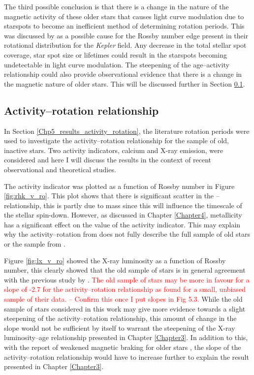 The third possible conclusion is that there is a change in the nature of the magnetic activity of these older stars that causes light curve modulation due to starspots to become an inefficient method of determining rotation periods. This was discussed by \citet{van_Saders_etal_2019} as a possible cause for the Rossby number edge present in their rotational distribution for the \textit{Kepler} field. Any decrease in the total stellar spot coverage, star spot size or lifetimes could result in the starspots becoming undetectable in light curve modulation. The steepening of the age--activity relationship \citet{Booth_etal_2017} could also provide observational evidence that there is a change in the magnetic nature of older stars. This will be discussed further in Section \ref{Chp5_discuss_activity_rotation}.

\subsection{Activity--rotation relationship}
\label{Chp5_discuss_activity_rotation}
In Section \ref{Chp5_results_activity_rotation}, the literature rotation periods were used to investigate the activity--rotation relationship for the sample of old, inactive stars. Two activity indicators, calcium and X-ray emission, were considered and here I will discuss the results in the context of recent observational and theoretical studies.

The \Rprime activity indicator was plotted as a function of Rossby number in Figure \ref{fig:rhk_v_ro}. This plot shows that there is significant scatter in the \Rprime--\Ro relationship, this is partly due to mass since this will influence the timescale of the stellar spin-down. However, as discussed in Chapter \ref{Chapter4}, metallicity has a significant effect on the value of the \Rprime activity indicator. This may explain why the activity--rotation from \citet{Mamajek_Hillenbrand_2008} does not fully describe the full sample of old stars or the sample from \citet{Baliunas_etal_1996}.

Figure \ref{fig:lx_v_ro} showed the X-ray luminosity as a function of Rossby number, this clearly showed that the old sample of stars is in general agreement with the previous study by \citet{Wright_etal_2011}. \textcolor{red}{The old sample of stars may be more in favour for a slope of -2.7 for the activity--rotation relationship as \citet{Wright_etal_2011} found for a small, unbiased sample of their data. -- Confirm this once I put slopes in Fig 5.3.} While the old sample of stars considered in this work may give more evidence towards a slight steepening of the activity--rotation relationship, this amount of change in the slope would not be sufficient by itself to warrant the steepening of the X-ray luminosity--age relationship presented in Chapter \ref{Chapter3}. In addition to this, with the report of weakened magnetic braking for older stars \citep{van_Saders_etal_2016}, the slope of the activity--rotation relationship would have to increase further to explain the result presented in Chapter \ref{Chapter3}. 

